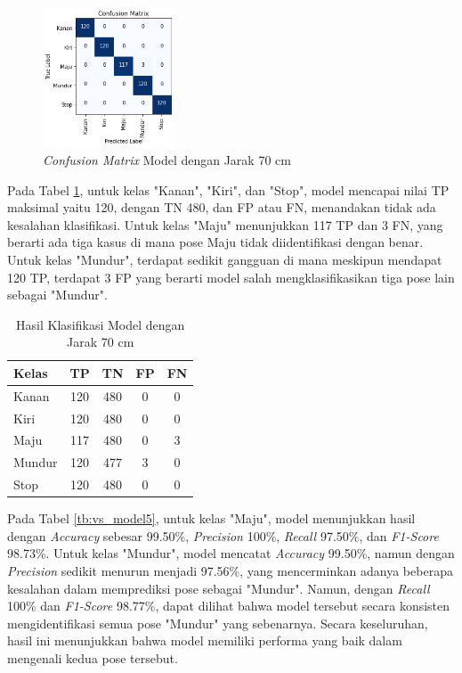 \begin{figure} [H] \centering
  \includegraphics[width=0.35\textwidth]{gambar/bab4/model8 (90cm)/matrix.png}
  \caption{\emph{Confusion Matrix} Model dengan Jarak 70 cm}
  \label{fig:matrix5}
\end{figure}

Pada Tabel \ref{tb:cm_model5}, untuk kelas "Kanan", "Kiri", dan "Stop", model mencapai nilai TP maksimal yaitu 120, dengan TN 480, dan FP atau FN, menandakan tidak ada kesalahan klasifikasi. Untuk kelas "Maju" menunjukkan 117 TP dan 3 FN, yang berarti ada tiga kasus di mana pose Maju tidak diidentifikasi dengan benar. Untuk kelas "Mundur", terdapat sedikit gangguan di mana meskipun mendapat 120 TP, terdapat 3 FP yang berarti model salah mengklasifikasikan tiga pose lain sebagai "Mundur".

\begin{longtable}{|l|c|c|c|c|}
  \caption{Hasil Klasifikasi Model dengan Jarak 70 cm}
  \label{tb:cm_model5} \\
  \hline
  \rowcolor[HTML]{C0C0C0} 
  \textbf{Kelas} & \textbf{TP} & \textbf{TN} & \textbf{FP} & \textbf{FN} \\ \hline
  Kanan    & 120          & 480         & 0           & 0           \\ \hline
  Kiri      & 120          & 480         & 0           & 0           \\ \hline
  Maju      & 117          & 480         & 0           & 3           \\ \hline
  Mundur     & 120          & 477         & 3           & 0           \\ \hline
  Stop  & 120          & 480         & 0           & 0           \\ \hline
\end{longtable}


Pada Tabel \ref{tb:vs_model5}, untuk kelas "Maju", model menunjukkan hasil dengan \emph{Accuracy} sebesar 99.50\%, \emph{Precision} 100\%, \emph{Recall} 97.50\%, dan \emph{F1-Score} 98.73\%. Untuk kelas "Mundur", model mencatat \emph{Accuracy} 99.50\%, namun dengan \emph{Precision} sedikit menurun menjadi 97.56\%, yang mencerminkan adanya beberapa kesalahan dalam memprediksi pose sebagai "Mundur". Namun, dengan \emph{Recall} 100\% dan \emph{F1-Score} 98.77\%, dapat dilihat bahwa model tersebut secara konsisten mengidentifikasi semua pose "Mundur" yang sebenarnya. Secara keseluruhan, hasil ini menunjukkan bahwa model memiliki performa yang baik dalam mengenali kedua pose tersebut.

